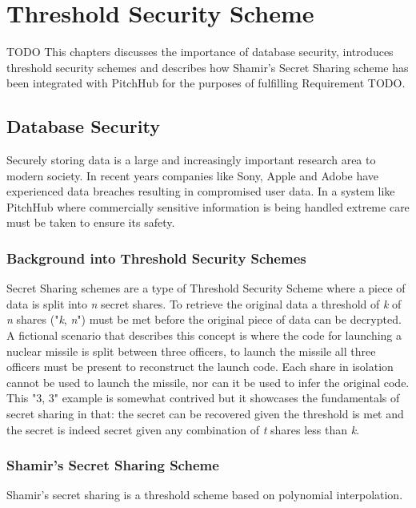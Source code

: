 \chapter{Threshold Security Scheme}\label{C:threshholdSecurity}
TODO This chapters discusses the importance of database security, introduces threshold security schemes and describes how Shamir's Secret Sharing scheme has been integrated with PitchHub for the purposes of fulfilling Requirement TODO.

\section{Database Security}\label{S:databaseSecurity}
Securely storing data is a large and increasingly important research area to modern society. In recent years companies like Sony, Apple and Adobe have experienced data breaches resulting in compromised user data. In a system like PitchHub where commercially sensitive information is being handled extreme care must be taken to ensure its safety.

\subsection{Background into Threshold Security Schemes}
Secret Sharing schemes are a type of Threshold Security Scheme where a piece of data is split into \textit{n} secret shares. To retrieve the original data a threshold of \textit{k} of \textit{n} shares ("\textit{k}, \textit{n}") must be met before the original piece of data can be decrypted. A fictional scenario that describes this concept is where the code for launching a nuclear missile is split between three officers, to launch the missile all three officers must be present to reconstruct the launch code. Each share in isolation cannot be used to launch the missile, nor can it be used to infer the original code. This "3, 3" example is somewhat contrived but it showcases the fundamentals of secret sharing in that: the secret can be recovered given the threshold is met and the secret is indeed secret given any combination of \textit{t} shares less than \textit{k}.

\subsection{Shamir's Secret Sharing Scheme}
Shamir's secret sharing \cite{shamir1979share} is a threshold scheme based on polynomial interpolation. 

